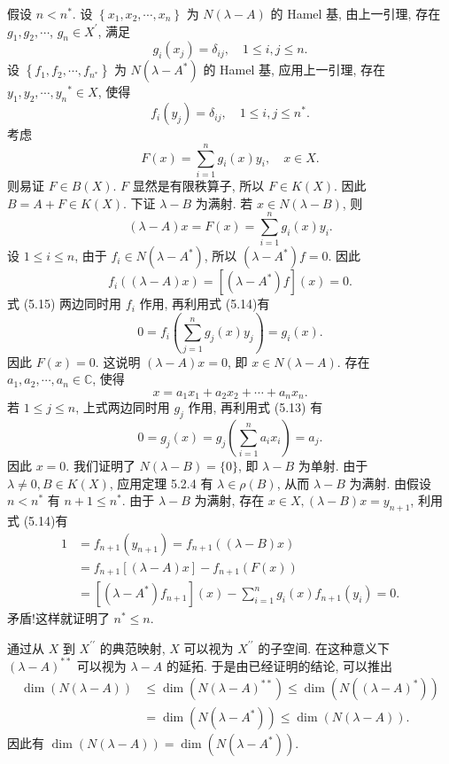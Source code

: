 \documentclass[openany]{ctexbook}
\makeatletter
\theoremstyle{kaiti}
\theoremstyle{normal}
\renewenvironment{proof}[1][\proofname]{\par
    \pushQED{\qed}%
    \normalfont \topsep6\p@\@plus6\p@\relax
    \trivlist
    \item\relax
    {\heiti #1}\hspace{2\labelsep}\ignorespaces
  }{%
    \popQED\endtrivlist\@endpefalse
  }
\makeatother
\begin{document}
\begin{proof}
假设 $n<n^{*}$. 设 $\left\{x_1, x_2, \cdots, x_n\right\}$ 为 $N(\lambda-A)$ 的 Hamel 基, 由上一引理, 存在 $g_1, g_2, \cdots$, $g_n \in X^{\prime}$, 满足
\begin{equation}
  g_{i}\left(x_{j}\right)=\delta_{i j}, \quad 1 \leqslant i, j \leqslant n.
\end{equation}
设 $\left\{f_1, f_2, \cdots, f_{n^{*}}\right\}$ 为 $N\left(\lambda-A^{*}\right)$ 的 Hamel 基, 应用上一引理, 存在 $y_1, y_2, \cdots, y_n{ }^{*} \in X$, 使得
\begin{equation}
  f_{i}\left(y_{j}\right)=\delta_{i j}, \quad 1 \leqslant i, j \leqslant n^{*}.
\end{equation}
考虑
$$
F(x)=\sum_{i=1}^n g_{i}(x) y_{i}, \quad x \in X.
$$
则易证 $F \in B(X)$. $F$ 显然是有限秩算子, 所以 $F \in K(X)$. 因此 $B=A+F \in K(X)$. 下证 $\lambda-B$ 为满射.
若 $x \in N(\lambda-B)$, 则
\begin{equation}
  (\lambda-A) x=F(x)=\sum_{i=1}^n g_{i}(x) y_{i}.
\end{equation}
设 $1 \leqslant i \leqslant n$, 由于 $f_{i} \in N\left(\lambda-A^{*}\right)$, 所以 $\left(\lambda-A^{*}\right) f=0$. 因此
$$
f_{i}((\lambda-A) x)=\left[\left(\lambda-A^{*}\right) f\right](x)=0.
$$
式 (5.15) 两边同时用 $f_{i}$ 作用, 再利用式 (5.14)有
$$
0=f_{i}\left(\sum_{j=1}^n g_{j}(x) y_{j}\right)=g_{i}(x).
$$
因此 $F(x)=0$. 这说明 $(\lambda-A) x=0$, 即 $x \in N(\lambda-A)$. 存在 $a_1, a_2, \cdots, a_n \in \mathbb{C}$, 使得
$$
x=a_1 x_1+a_2 x_2+\cdots+a_n x_n.
$$
若 $1 \leqslant j \leqslant n$, 上式两边同时用 $g_{j}$ 作用, 再利用式 (5.13) 有
$$
0=g_{j}(x)=g_{j}\left(\sum_{i=1}^n a_{i} x_{i}\right)=a_{j}.
$$
因此 $x=0$. 我们证明了 $N(\lambda-B)=\{0\}$, 即 $\lambda-B$ 为单射. 由于 $\lambda \neq 0, B \in K(X)$, 应用定理 5.2.4 有 $\lambda \in \rho(B)$, 从而 $\lambda-B$ 为满射.
由假设 $n<n^{*}$ 有 $n+1 \leqslant n^{*}$. 由于 $\lambda-B$ 为满射, 存在 $x \in X,(\lambda-B) x=y_{n+1}$, 利用式 (5.14)有
$$
\begin{aligned}
1 &=f_{n+1}\left(y_{n+1}\right)=f_{n+1}((\lambda-B) x) \\
&=f_{n+1}[(\lambda-A) x]-f_{n+1}(F(x)) \\
&=\left[\left(\lambda-A^{*}\right) f_{n+1}\right](x)-\sum_{i=1}^n g_{i}(x) f_{n+1}\left(y_{i}\right)=0.
\end{aligned}
$$
矛盾!这样就证明了 $n^{*} \leqslant n$.

通过从 $X$ 到 $X^{\prime \prime}$ 的典范映射, $X$ 可以视为 $X^{\prime \prime}$ 的子空间. 在这种意义下 $(\lambda-A)^{* *}$ 可以视为 $\lambda-A$ 的延拓. 于是由已经证明的结论, 可以推出
$$
\begin{aligned}
\operatorname{dim}(N(\lambda-A)) & \leqslant \operatorname{dim}\left(N(\lambda-A)^{* *}\right) \leqslant \operatorname{dim}\left(N\left((\lambda-A)^{*}\right)\right) \\
&=\operatorname{dim}\left(N\left(\lambda-A^{*}\right)\right) \leqslant \operatorname{dim}(N(\lambda-A)).
\end{aligned}
$$
因此有 $\operatorname{dim}(N(\lambda-A))=\operatorname{dim}\left(N\left(\lambda-A^{*}\right)\right)$.
\end{proof}
\end{document}
